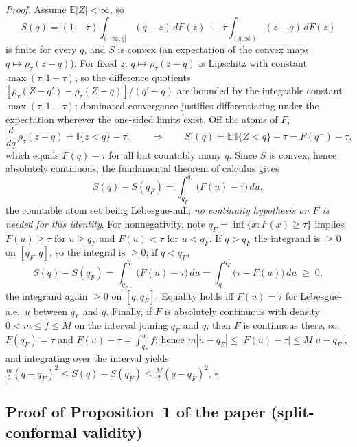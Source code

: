 \documentclass[11pt]{article}
\begin{document}
\noindent\emph{Proof.} Assume $\mathbb{E}|Z|<\infty$, so
\[
S(q) = (1-\tau)\!\int_{(-\infty,q]}\!(q-z)\,dF(z)
\;+\; \tau\!\int_{(q,\infty)}\!(z-q)\,dF(z)
\]
is finite for every $q$, and $S$ is convex (an expectation of the
convex maps $q\mapsto\rho_\tau(z-q)$). For fixed $z$, $q\mapsto
\rho_\tau(z-q)$ is Lipschitz with constant $\max(\tau,1-\tau)$, so the
difference quotients $[\rho_\tau(Z-q')-\rho_\tau(Z-q)]/(q'-q)$ are
bounded by the integrable constant $\max(\tau,1-\tau)$; dominated
convergence justifies differentiating under the expectation wherever the
one-sided limits exist. Off the atoms of $F$,
\[
\frac{d}{dq}\,\rho_\tau(z-q) = \mathbb{I}\{z<q\}-\tau ,
\qquad\Longrightarrow\qquad
S'(q) = \mathbb{E}\,\mathbb{I}\{Z<q\}-\tau = F(q^-)-\tau,
\]
which equals $F(q)-\tau$ for all but countably many $q$. Since $S$ is
convex, hence absolutely continuous, the fundamental theorem of
calculus gives
\[
S(q)-S(q_F)=\int_{q_F}^{q}\big(F(u)-\tau\big)\,du,
\]
the countable atom set being Lebesgue-null; \emph{no continuity
hypothesis on $F$ is needed for this identity}. For nonnegativity,
note $q_F=\inf\{x:F(x)\ge\tau\}$ implies $F(u)\ge\tau$ for $u\ge q_F$
and $F(u)<\tau$ for $u<q_F$. If $q>q_F$ the integrand is $\ge0$ on
$[q_F,q]$, so the integral is $\ge0$; if $q<q_F$,
\[
S(q)-S(q_F)=\int_{q_F}^{q}\big(F(u)-\tau\big)\,du
=\int_{q}^{q_F}\big(\tau-F(u)\big)\,du\;\ge\;0 ,
\]
the integrand again $\ge0$ on $[q,q_F]$. Equality holds iff $F(u)=\tau$
for Lebesgue-a.e.\ $u$ between $q_F$ and $q$. Finally, if $F$ is
absolutely continuous with density $0<m\le f\le M$ on the interval
joining $q_F$ and $q$, then $F$ is continuous there, so $F(q_F)=\tau$
and $F(u)-\tau=\int_{q_F}^{u}f$; hence $m|u-q_F|\le|F(u)-\tau|\le
M|u-q_F|$, and integrating over the interval yields
$\tfrac{m}{2}(q-q_F)^2\le S(q)-S(q_F)\le\tfrac{M}{2}(q-q_F)^2$.
\hfill$\square$

\subsection*{Proof of Proposition~1 of the paper (split-conformal
validity)}
\end{document}
